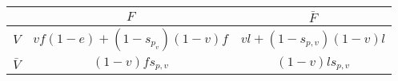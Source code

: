 \begin{tabular}{ccc}
\toprule
 & $F$ & $\bar{F}$ \\
\midrule
$V$ & $vf(1-e)+(1-s_{p_v})(1-v)f$ & $vl + (1-s_{p,v})(1-v)l$ \\
$\bar{V}$ & $(1-v)fs_{p,v}$ & $(1-v)ls_{p,v}$ \\
\bottomrule
\end{tabular}